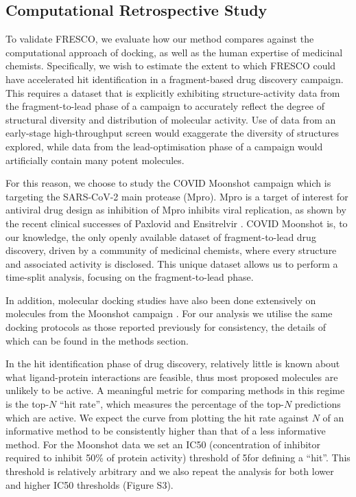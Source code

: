\subsection{Computational Retrospective Study} \label{subsec:retrospective}

To validate FRESCO, we evaluate how our method compares against the computational approach of docking, as well as the human expertise of medicinal chemists. Specifically, we wish to estimate the extent to which FRESCO could have accelerated hit identification in a fragment-based drug discovery campaign. This requires a dataset that is explicitly exhibiting structure-activity data from the fragment-to-lead phase of a campaign to accurately reflect the degree of structural diversity and distribution of molecular activity. Use of data from an early-stage high-throughput screen would exaggerate the diversity of structures explored, while data from the lead-optimisation phase of a campaign would artificially contain many potent molecules.

For this reason, we choose to study the COVID Moonshot campaign \cite{Moonshot2022} which is targeting the SARS-CoV-2 main protease (Mpro). Mpro is a target of interest for antiviral drug design as inhibition of Mpro inhibits viral replication, as shown by the recent clinical successes of Paxlovid and Ensitrelvir \cite{Dafydd2021Paxlovid,unoh2022discovery}. COVID Moonshot is, to our knowledge, the only openly available dataset of fragment-to-lead drug discovery, driven by a community of medicinal chemists, where every structure and associated activity is disclosed. This unique dataset allows us to perform a time-split analysis, focusing on the fragment-to-lead phase.

In addition, molecular docking studies have also been done extensively on molecules from the Moonshot campaign \cite{Morris2021Rank, Saar2021biorxiv}. For our analysis we utilise the same docking protocols as those reported previously for consistency, the details of which can be found in the methods section.

In the hit identification phase of drug discovery, relatively little is known about what ligand-protein interactions are feasible, thus most proposed molecules are unlikely to be active. A meaningful metric for comparing methods in this regime is the top-$N$ ``hit rate'', which measures the percentage of the top-$N$ predictions which are active. We expect the curve from plotting the hit rate against $N$ of an informative method to be consistently higher than that of a less informative method. For the Moonshot data we set an IC50 (concentration of inhibitor required to inhibit 50\% of protein activity) threshold of 5\uM for defining a ``hit''. This threshold is relatively arbitrary and we also repeat the analysis for both lower and higher IC50 thresholds (Figure S3).

